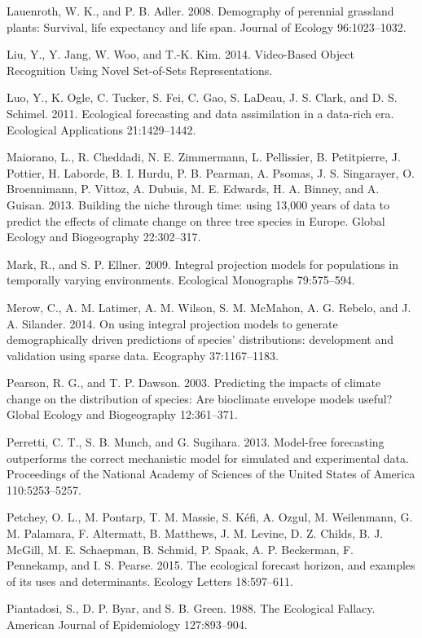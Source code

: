 \documentclass[12pt,]{article}
\begin{document}
Lauenroth, W. K., and P. B. Adler. 2008. Demography of perennial
grassland plants: Survival, life expectancy and life span. Journal of
Ecology 96:1023--1032.

Liu, Y., Y. Jang, W. Woo, and T.-K. Kim. 2014. Video-Based Object
Recognition Using Novel Set-of-Sets Representations.

Luo, Y., K. Ogle, C. Tucker, S. Fei, C. Gao, S. LaDeau, J. S. Clark, and
D. S. Schimel. 2011. Ecological forecasting and data assimilation in a
data-rich era. Ecological Applications 21:1429--1442.

Maiorano, L., R. Cheddadi, N. E. Zimmermann, L. Pellissier, B.
Petitpierre, J. Pottier, H. Laborde, B. I. Hurdu, P. B. Pearman, A.
Psomas, J. S. Singarayer, O. Broennimann, P. Vittoz, A. Dubuis, M. E.
Edwards, H. A. Binney, and A. Guisan. 2013. Building the niche through
time: using 13,000 years of data to predict the effects of climate
change on three tree species in Europe. Global Ecology and Biogeography
22:302--317.

Mark, R., and S. P. Ellner. 2009. Integral projection models for
populations in temporally varying environments. Ecological Monographs
79:575--594.

Merow, C., A. M. Latimer, A. M. Wilson, S. M. McMahon, A. G. Rebelo, and
J. A. Silander. 2014. On using integral projection models to generate
demographically driven predictions of species' distributions:
development and validation using sparse data. Ecography 37:1167--1183.

Pearson, R. G., and T. P. Dawson. 2003. Predicting the impacts of
climate change on the distribution of species: Are bioclimate envelope
models useful? Global Ecology and Biogeography 12:361--371.

Perretti, C. T., S. B. Munch, and G. Sugihara. 2013. Model-free
forecasting outperforms the correct mechanistic model for simulated and
experimental data. Proceedings of the National Academy of Sciences of
the United States of America 110:5253--5257.

Petchey, O. L., M. Pontarp, T. M. Massie, S. Kéfi, A. Ozgul, M.
Weilenmann, G. M. Palamara, F. Altermatt, B. Matthews, J. M. Levine, D.
Z. Childs, B. J. McGill, M. E. Schaepman, B. Schmid, P. Spaak, A. P.
Beckerman, F. Pennekamp, and I. S. Pearse. 2015. The ecological forecast
horizon, and examples of its uses and determinants. Ecology Letters
18:597--611.

Piantadosi, S., D. P. Byar, and S. B. Green. 1988. The Ecological
Fallacy. American Journal of Epidemiology 127:893--904.
\end{document}
